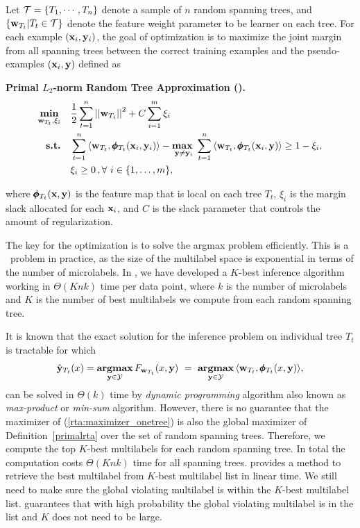 {Let $\mathcal{T}=\{T_1,\cdots,T_n\}$ denote a sample of $n$ random spanning trees, and $\{\mathbf {w}_{T_t}|T_t\in\mathcal{T}\}$ denote the feature weight parameter to be learner on each tree.
For each example $(\mathbf {x}_i,\mathbf {y}_i)$, the goal of optimization is to maximize the joint margin from all spanning trees between the correct training examples and the pseudo-examples $(\mathbf {x}_i,\mathbf {y})$ defined as
\begin{definition}{\bf Primal $L_2$-norm Random Tree Approximation (\rta).}\label{primalrta}
	\begin{align*}
		\underset{\vw_{T_t},\xi_i}{\minimize} & \quad \frac{1}{2}\sum_{t=1}^{n}\norm{\vw_{T_t}}^2 + C\sum_{i=1}^{m}\xi_i\\
		\st & \quad \sum_{t=1}^{n}{ \langle \vw_{T_t}, \phib_{T_t}(\vx_i,\vy_i) \rangle} - \underset{\vy \neq \vy_i}{\maximize\ } \sum_{t=1}^{n}{\langle \vw_{T_t}, \phib_{T_t}(\vx_i,\vy) \rangle } \geq 1 -  \xi_i, \\
		& \quad \xi_i\ge0\, , \forall\ i \in \set{1,\dots,m},
	\end{align*}
\end{definition}
where $\pmb \phi_{T_t}(\mathbf {x},\mathbf {y})$ is the feature map that is local on each tree $T_t$, $\xi_i$ is the margin slack allocated for each $\mathbf {x}_i$, and $C$ is the slack parameter that controls the amount of regularization.

The key for the optimization is to solve the argmax problem efficiently.
This is a \nphard\ problem in practice, as the size of the multilabel space is exponential in terms of the number of microlabels.
In , we have developed a $K$-best inference algorithm working in $\Theta(Knk)$ time per data point, where $k$ is the number of microlabels and $K$ is the number of best multilabels we compute from each random spanning tree.

It is known that the exact solution for the inference problem on individual tree $T_t$ is tractable \citep{Koller09probabilistic} for which 
\begin{align}
	\hat{\mathbf {y}}_{T_t}(x) = \underset{\mathbf {y}\in\mathcal{Y}}{\textbf{argmax}}\, F_{\mathbf {w}_{T_t}}(x,\mathbf {y})\ =\ \underset{\mathbf {y}\in\mathcal{Y}}{\textbf{argmax}}\, \langle \mathbf {w}_{T_t}, \pmb \phi_{T_t}(x,\mathbf {y})\rangle, \label{rta:maximizer_onetree}
\end{align}
can be solved in $\Theta(k)$ time by \textit{dynamic programming} algorithm also known as \textit{max-product} or \textit{min-sum} algorithm.
However, there is no guarantee that the maximizer of (\ref{rta:maximizer_onetree}) is also the global maximizer of Definition~\ref{primalrta} over the set of random spanning trees.
Therefore, we compute the top $K$-best multilabels for each random spanning tree.
In total the computation costs $\Theta(Knk)$ time for all spanning trees.
 provides a method to retrieve the best multilabel from $K$-best multilabel list in linear time.
We still need to make sure the global violating multilabel is within the $K$-best multilabel list.
 guarantees that with high probability the global violating multilabel is in the list and $K$ does not need to be large.

}
